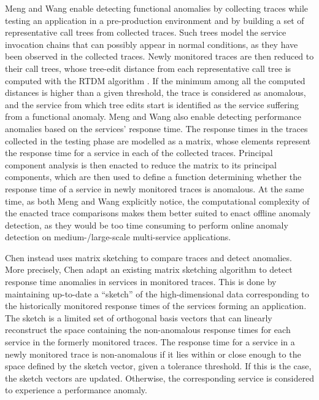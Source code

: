 Meng \etal \cite{23_Meng2021_DetectingAnomaliesMicroservices} and Wang \etal \cite{26_Wang2020_WorkflowAwareFaultDiagnosis} enable detecting functional anomalies by collecting traces while testing an application in a pre-production environment and by building a set of representative call trees from collected traces.
Such trees model the service invocation chains that can possibly appear in normal conditions, as they have been observed in the collected traces. %
Newly monitored traces are then reduced to their call trees, whose tree-edit distance from each representative call tree is computed with the RTDM algorithm \cite{Reis2004_RTDM}.
If the minimum among all the computed distances is higher than a given threshold, the trace is considered as anomalous, and the service from which tree edits start is identified as the service suffering from a functional anomaly.
Meng \etal \cite{23_Meng2021_DetectingAnomaliesMicroservices} and Wang \etal \cite{26_Wang2020_WorkflowAwareFaultDiagnosis} also enable detecting performance anomalies based on the services' response time.
The response times in the traces collected in the testing phase are modelled as a matrix, whose elements represent the response time for a service in each of the collected traces.
Principal component analysis \cite{Jolliffe2011_PCA} is then enacted to reduce the matrix to its principal components, which are then used to define a function determining whether the response time of a service in newly monitored traces is anomalous.
At the same time, as both Meng \etal \cite{23_Meng2021_DetectingAnomaliesMicroservices} and Wang \etal \cite{20_Wang2020_RootCauseMetricLocation} explicitly notice, the computational complexity of the enacted trace comparisons makes them better suited to enact offline anomaly detection, as they would be too time consuming to perform online anomaly detection on medium-/large-scale multi-service applications. 

Chen \etal \cite{39_Chen2020_MatrixSketchBasedAnomalyDetection} instead uses matrix sketching to compare traces and detect anomalies.
More precisely, Chen \etal \cite{39_Chen2020_MatrixSketchBasedAnomalyDetection} adapt an existing matrix sketching algorithm \cite{Huang2015_MatrixSketching} to detect response time anomalies in services in monitored traces. 
This is done by maintaining up-to-date a \enquote{sketch} of the high-dimensional data corresponding to the historically monitored response times of the services forming an application.
The sketch is a limited set of orthogonal basis vectors that can linearly reconstruct the space containing the non-anomalous response times for each service in the formerly monitored traces. 
The response time for a service in a newly monitored trace is non-anomalous if it lies within or close enough to the space defined by the sketch vector, given a tolerance threshold.
If this is the case, the sketch vectors are updated.
Otherwise, the corresponding service is considered to experience a performance anomaly.

